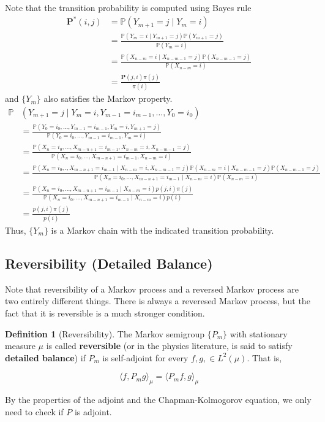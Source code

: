 \documentclass{article}
\theoremstyle{definition}
\theoremstyle{remark}
\theoremstyle{definition}
\newtheorem{definition}{Definition}[section]
\begin{document}
      Note that the transition probability is computed using Bayes rule 
      \begin{align*}
          \mathbf{P^*}(i, j) & = \mathbb{P}(Y_{m + 1} = j \mid Y_m = i) \\
          & = \frac{\mathbb{P}(Y_m = i \mid Y_{m+1} = j) \mathbb{P}(Y_{m+1} = j)}{\mathbb{P}(Y_m = i)} \\
          & = \frac{\mathbb{P}(X_{n-m} = i \mid X_{n-m-1} = j) \mathbb{P}(X_{n-m-1} = j)}{\mathbb{P}(X_{n-m} = i)} \\
          & = \frac{\mathbf{P}(j, i) \pi(j)}{\pi(i)}
      \end{align*}
      and $\{Y_m\}$ also satisfies the Markov property. 
      \begin{align*}
          \mathbb{P}&(Y_{m+1} = j \mid Y_m = i, Y_{m-1} = i_{m-1}, \ldots, Y_0 = i_0) \\
          & = \frac{\mathbb{P}(Y_0 = i_0, \ldots, Y_{m-1} = i_{m-1}, Y_{m} = i, Y_{m+1} = j)}{\mathbb{P}(Y_0 = i_0, \ldots, Y_{m-1} = i_{m-1}, Y_{m} = i)} \\
          & = \frac{\mathbb{P}(X_n = i_0, \ldots, X_{m-n+1} = i_{m-1}, X_{n-m} = i, X_{n-m-1} = j)}{\mathbb{P}(X_n = i_0, \ldots, X_{m-n+1} = i_{m-1}, X_{n-m} = i)} \\
          & = \frac{\mathbb{P}(X_n = i_0, . , X_{m-n+1} = i_{m-1} \mid X_{n-m} = i, X_{n-m-1} = j) \mathbb{P}(X_{n-m} = i \mid X_{n-m-1} = j) \mathbb{P}(X_{n-m-1} = j)}{\mathbb{P}(X_n = i_0, \ldots, X_{m-n+1} = i_{m-1} \mid X_{n-m} = i) \mathbb{P}(X_{n-m} = i)} \\
          & = \frac{\mathbb{P}(X_n = i_0, \ldots, X_{m-n+1} = i_{m-1} \mid X_{n-m} = i) p(j, i) \pi(j)}{\mathbb{P}(X_n = i_0, \ldots, X_{m-n+1} = i_{m-1} \mid X_{n-m} = i) p(i)} \\
          & = \frac{p(j, i) \pi(j)}{p(i)}
      \end{align*}
      Thus, $\{Y_m\}$ is a Markov chain with the indicated transition probability. 

  \subsection{Reversibility (Detailed Balance)}

    Note that reversibility of a Markov process and a reversed Markov process are two entirely different things. There is always a reveresed Markov process, but the fact that it is reversible is a much stronger condition. 

    \begin{definition}[Reversibility]
      The Markov semigroup $\{P_m\}$ with stationary measure $\mu$ is called \textbf{reversible} (or in the physics literature, is said to satisfy \textbf{detailed balance}) if $P_m$ is self-adjoint for every $f, g, \in L^2 (\mu)$. That is, 

        \[\langle f, P_m g \rangle_\mu = \langle P_m f, g \rangle_\mu\]

      By the properties of the adjoint and the Chapman-Kolmogorov equation, we only need to check if $P$ is adjoint. 
    \end{definition}
\end{document}
